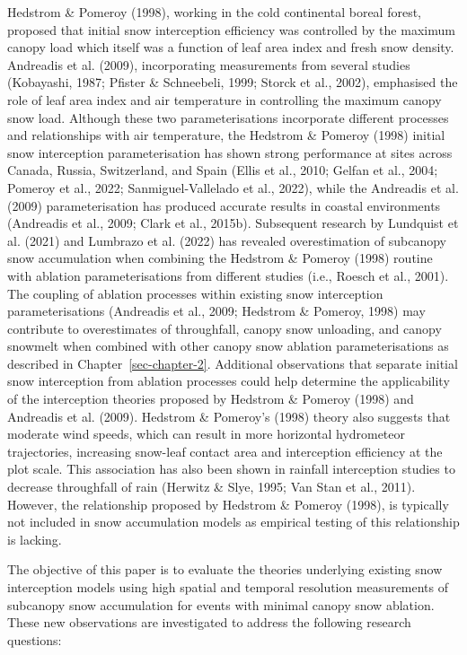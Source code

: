 \documentclass[
  letterpaper,
]{tex/uofsthesis-cs}
\begin{document}
Hedstrom \& Pomeroy (1998), working in the cold continental boreal
forest, proposed that initial snow interception efficiency was
controlled by the maximum canopy load which itself was a function of
leaf area index and fresh snow density. Andreadis et al. (2009),
incorporating measurements from several studies (Kobayashi, 1987;
Pfister \& Schneebeli, 1999; Storck et al., 2002), emphasised the role
of leaf area index and air temperature in controlling the maximum canopy
snow load. Although these two parameterisations incorporate different
processes and relationships with air temperature, the Hedstrom \&
Pomeroy (1998) initial snow interception parameterisation has shown
strong performance at sites across Canada, Russia, Switzerland, and
Spain (Ellis et al., 2010; Gelfan et al., 2004; Pomeroy et al., 2022;
Sanmiguel-Vallelado et al., 2022), while the Andreadis et al. (2009)
parameterisation has produced accurate results in coastal environments
(Andreadis et al., 2009; Clark et al., 2015b). Subsequent research by
Lundquist et al. (2021) and Lumbrazo et al. (2022) has revealed
overestimation of subcanopy snow accumulation when combining the
Hedstrom \& Pomeroy (1998) routine with ablation parameterisations from
different studies (i.e., Roesch et al., 2001). The coupling of ablation
processes within existing snow interception parameterisations (Andreadis
et al., 2009; Hedstrom \& Pomeroy, 1998) may contribute to overestimates
of throughfall, canopy snow unloading, and canopy snowmelt when combined
with other canopy snow ablation parameterisations as described in
Chapter~\ref{sec-chapter-2}. Additional observations that separate
initial snow interception from ablation processes could help determine
the applicability of the interception theories proposed by Hedstrom \&
Pomeroy (1998) and Andreadis et al. (2009). Hedstrom \& Pomeroy's (1998)
theory also suggests that moderate wind speeds, which can result in more
horizontal hydrometeor trajectories, increasing snow-leaf contact area
and interception efficiency at the plot scale. This association has also
been shown in rainfall interception studies to decrease throughfall of
rain (Herwitz \& Slye, 1995; Van Stan et al., 2011). However, the
relationship proposed by Hedstrom \& Pomeroy (1998), is typically not
included in snow accumulation models as empirical testing of this
relationship is lacking.

The objective of this paper is to evaluate the theories underlying
existing snow interception models using high spatial and temporal
resolution measurements of subcanopy snow accumulation for events with
minimal canopy snow ablation. These new observations are investigated to
address the following research questions:
\end{document}
